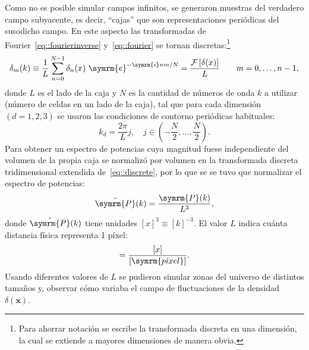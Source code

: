 Como no es posible simular campos infinitos, se generaron muestras del verdadero campo subyacente, es decir, ``cajas'' que son representaciones periódicas del susodicho campo. En este aspecto las transformadas de Fourier~\eqref{eq::fourierinverse} y~\eqref{eq::fourier} se tornan discretas:\footnote{Para ahorrar notación se escribe la transformada discreta en una dimensión, la cual se extiende a mayores dimensiones de manera obvia.}
\begin{equation}
    \delta_m(k)\equiv\frac{1}{L}\sum_{n=0}^{N-1}\delta_n(x)\ \symrm{e}^{-\symrm{i}nm/N}=\frac{\mathcal{F}\left[\delta({x})\right]}{L}\qquad m=0,\ldots,n-1,\label{eq::discrete}
\end{equation}
donde \(L\) es el lado de la caja y \(N\) es la cantidad de números de onda \(k\) a utilizar (número de celdas en un lado de la caja), tal que para cada dimensión \((d=1,2,3)\) se usaron las condiciones de contorno periódicas habituales:
\begin{equation}
    k_d=\frac{2\pi}{L}j,\quad j\in\left(-\frac{N}{2},\ldots,\frac{N}{2}\right).\label{eq::knumbers}
\end{equation}
Para obtener un espectro de potencias cuya magnitud fuese independiente del volumen de la propia caja se normalizó por volumen en la transformada discreta tridimensional extendida de~\eqref{eq::discrete}, por lo que se se tuvo que normalizar el espectro de potencias:
\begin{equation}
    \tilde{\symrm{P}}(k)=\frac{\symrm{P}(k)}{L^3},
\end{equation}
donde \(\tilde{\symrm{P}}(k)\) tiene unidades \([x]^3\equiv[k]^{-3}\). El valor \(L\) indica cuánta distancia física representa 1 píxel:
\begin{equation}
    [L]=\frac{[x]}{[\symrm{p\acute{\imath}xel}]}.
\end{equation}
Usando diferentes valores de \(L\) se pudieron simular zonas del universo de distintos tamaños y, observar cómo variaba el campo de fluctuaciones de la densidad \(\delta(\symbf{x})\).
